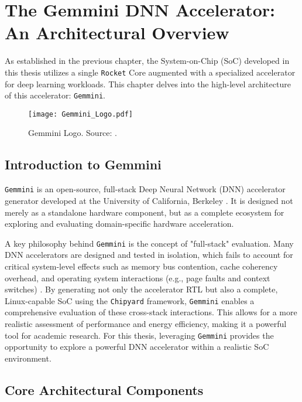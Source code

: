 \chapter{The Gemmini DNN Accelerator: An Architectural Overview}
\label{chap:gemmini_overview}

As established in the previous chapter, the System-on-Chip (SoC) developed in this thesis utilizes a single \texttt{Rocket} Core augmented with a specialized accelerator for deep learning workloads. This chapter delves into the high-level architecture of this accelerator: \texttt{Gemmini}. 

\begin{figure}[htbp]
    \centering
    \texttt{[image: Gemmini\_Logo.pdf]}
    \caption{Gemmini Logo. Source: \cite{gemini-dac}.}
    \label{fig:gemmini_logo}
\end{figure}

\section{Introduction to Gemmini}
\label{sec:gemmini_intro}

\texttt{Gemmini} is an open-source, full-stack Deep Neural Network (DNN) accelerator generator developed at the University of California, Berkeley \cite{gemini-dac}. It is designed not merely as a standalone hardware component, but as a complete ecosystem for exploring and evaluating domain-specific hardware acceleration. 

A key philosophy behind \texttt{Gemmini} is the concept of "full-stack" evaluation. Many DNN accelerators are designed and tested in isolation, which fails to account for critical system-level effects such as memory bus contention, cache coherency overhead, and operating system interactions (e.g., page faults and context switches) \cite{gemini-dac}. By generating not only the accelerator RTL but also a complete, Linux-capable SoC using the \texttt{Chipyard} framework, \texttt{Gemmini} enables a comprehensive evaluation of these cross-stack interactions. This allows for a more realistic assessment of performance and energy efficiency, making it a powerful tool for academic research. For this thesis, leveraging \texttt{Gemmini} provides the opportunity to explore a powerful DNN accelerator within a realistic SoC environment.

\section{Core Architectural Components}
\label{sec:gemmini_core_components}

